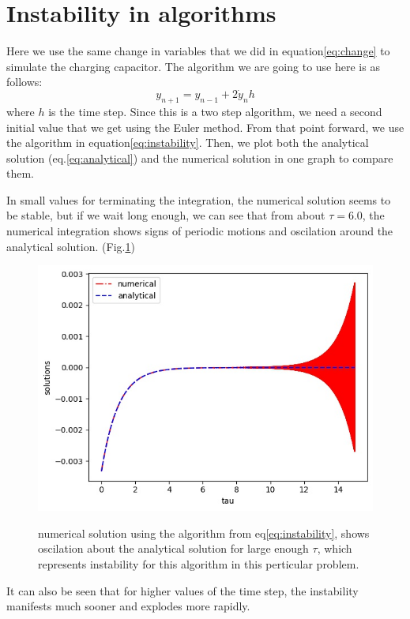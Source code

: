 \documentclass[12pt, a4paper]{article}
\begin{document}
	\section{Instability in algorithms}
	Here we use the same change in variables that we did in equation\ref{eq:change} to simulate the charging capacitor.
	The algorithm we are going to use here is as follows:
	\begin{equation} \label{eq:instability}
		y_{n + 1} = y_{n - 1} + 2 \dot{y}_n h
	\end{equation}
	where $h$ is the time step. Since this is a two step algorithm, we need a second initial value that we get using the Euler method. From that point
	forward, we use the algorithm in equation\ref{eq:instability}. Then, we plot both the analytical solution (eq.\ref{eq:analytical}) and the 
	numerical solution in one graph to compare them.
	
	In small values for terminating the integration, the numerical solution seems to be stable, but if we wait long enough, we can see that
	from about $\tau = 6.0$, the numerical integration shows signs of periodic motions and oscilation around the analytical solution. 
	(Fig.\ref{fig:instability})
	\begin{figure}[h!]
		\centering
		\includegraphics[width=0.8\linewidth]{../p3/instability.jpg}
		\label{fig:instability}
		\caption{numerical solution using the algorithm from eq\ref{eq:instability}, shows oscilation about the analytical solution for 
			large enough $\tau$, which represents instability for this algorithm in this perticular problem.}
	\end{figure}

	It can also be seen that for higher values of the time step, the instability manifests much sooner and explodes more rapidly.
\end{document}
